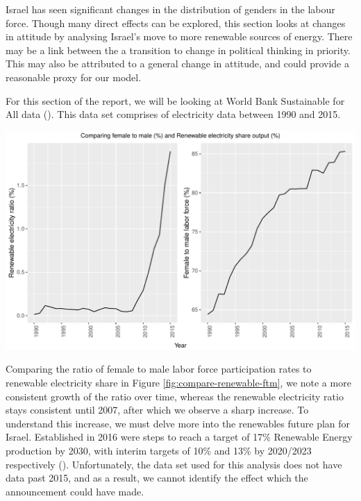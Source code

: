 \documentclass[11pt,a4paper,]{article}
\let\origfigure\figure
\let\endorigfigure\endfigure
\renewenvironment{figure}[1][2] {
    \expandafter\origfigure\expandafter[H]
} {
    \endorigfigure
}%
\begin{document}
Israel has seen significant changes in the distribution of genders in the labour force. Though many direct effects can be explored, this section looks at changes in attitude by analysing Israel's move to more renewable sources of energy. There may be a link between the a transition to change in political thinking in priority. This may also be attributed to a general change in attitude, and could provide a reasonable proxy for our model.

For this section of the report, we will be looking at World Bank Sustainable for All data (\textcite{TheWorldBank2018}). This data set comprises of electricity data between 1990 and 2015.

\begin{figure}
\centering
\includegraphics{report_files/figure-latex/compare-renewable-ftm-1.pdf}
\caption{\label{fig:compare-renewable-ftm}Comparing female to male ratio to renewable electricity output share}
\end{figure}

Comparing the ratio of female to male labor force participation rates to renewable electricity share in Figure \ref{fig:compare-renewable-ftm}, we note a more consistent growth of the ratio over time, whereas the renewable electricity ratio stays consistent until 2007, after which we observe a sharp increase. To understand this increase, we must delve more into the renewables future plan for Israel. Established in 2016 were steps to reach a target of 17\% Renewable Energy production by 2030, with interim targets of 10\% and 13\% by 2020/2023 respectively (\textcite{IEA2019}). Unfortunately, the data set used for this analysis does not have data past 2015, and as a result, we cannot identify the effect which the announcement could have made.
\end{document}
